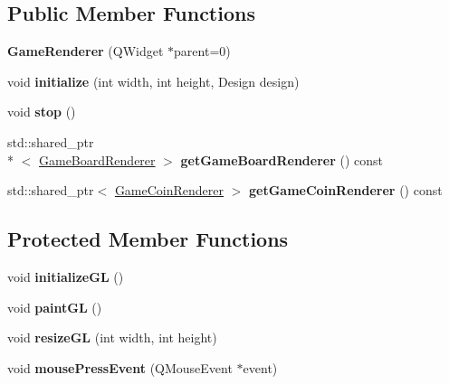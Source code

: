 \subsection*{Public Member Functions}
\begin{DoxyCompactItemize}
\item 
\hypertarget{class_game_renderer_a58bc8828909b59c2516549cf3a978f52}{{\bfseries Game\-Renderer} (Q\-Widget $\ast$parent=0)}\label{class_game_renderer_a58bc8828909b59c2516549cf3a978f52}

\item 
\hypertarget{class_game_renderer_a01dc39b34cda656bd5bd72c50103e306}{void {\bfseries initialize} (int width, int height, Design design)}\label{class_game_renderer_a01dc39b34cda656bd5bd72c50103e306}

\item 
\hypertarget{class_game_renderer_af733aa31dd1ace11b9a9b489f5e70573}{void {\bfseries stop} ()}\label{class_game_renderer_af733aa31dd1ace11b9a9b489f5e70573}

\item 
\hypertarget{class_game_renderer_a5a8dc2ad72bfeeebb1f127a5d746dad5}{std\-::shared\-\_\-ptr\\*
$<$ \hyperlink{class_game_board_renderer}{Game\-Board\-Renderer} $>$ {\bfseries get\-Game\-Board\-Renderer} () const }\label{class_game_renderer_a5a8dc2ad72bfeeebb1f127a5d746dad5}

\item 
\hypertarget{class_game_renderer_a28fc9bf401d821351a35f59bf5bd1761}{std\-::shared\-\_\-ptr$<$ \hyperlink{class_game_coin_renderer}{Game\-Coin\-Renderer} $>$ {\bfseries get\-Game\-Coin\-Renderer} () const }\label{class_game_renderer_a28fc9bf401d821351a35f59bf5bd1761}

\end{DoxyCompactItemize}
\subsection*{Protected Member Functions}
\begin{DoxyCompactItemize}
\item 
\hypertarget{class_game_renderer_ada3f9ec6a94622e3942106c35f910c17}{void {\bfseries initialize\-G\-L} ()}\label{class_game_renderer_ada3f9ec6a94622e3942106c35f910c17}

\item 
\hypertarget{class_game_renderer_afe54bbab14adcee6d4a30c2ac74aea84}{void {\bfseries paint\-G\-L} ()}\label{class_game_renderer_afe54bbab14adcee6d4a30c2ac74aea84}

\item 
\hypertarget{class_game_renderer_a96621b18ee77b658ba49ed13085006ab}{void {\bfseries resize\-G\-L} (int width, int height)}\label{class_game_renderer_a96621b18ee77b658ba49ed13085006ab}

\item 
\hypertarget{class_game_renderer_a88c0cc3a0a2ad5dce8ed5f738e8a7dc0}{void {\bfseries mouse\-Press\-Event} (Q\-Mouse\-Event $\ast$event)}\label{class_game_renderer_a88c0cc3a0a2ad5dce8ed5f738e8a7dc0}

\end{DoxyCompactItemize}


